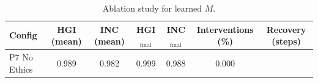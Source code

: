 \begin{table}[H]
\centering
\caption{Ablation study for learned $M$.}
\label{tab:p7_ablation}
\begin{tabular}{lcccccc}
\toprule
Config & HGI (mean) & INC (mean) & HGI$_{\text{final}}$ & INC$_{\text{final}}$ & Interventions (\%) & Recovery (steps) \\
\midrule
 P7 No Ethics & 0.989 & 0.982 & 0.999 & 0.988 & 0.000 &  \\
\bottomrule
\end{tabular}
\end{table}